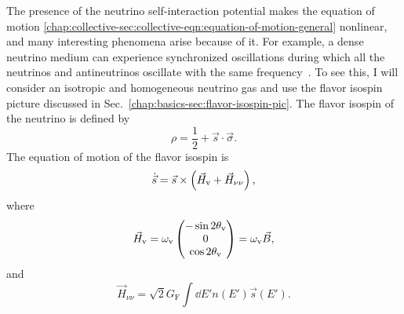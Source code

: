 The presence of the neutrino self-interaction potential makes the equation of motion \ref{chap:collective-sec:collective-eqn:equation-of-motion-general} nonlinear, and many interesting phenomena arise because of it. For example, a dense neutrino medium can experience synchronized oscillations during which all the neutrinos and antineutrinos oscillate with the same frequency~\cite{Pastor2002,Hannestad2006,Raffelt2008,Duan2010}. To see this, I will consider an isotropic and homogeneous neutrino gas and use the flavor isospin picture discussed in Sec.~\ref{chap:basics-sec:flavor-isospin-pic}. The flavor isospin of the neutrino is defined by
\begin{equation}
   \rho = \frac{1}{2} + \vec s \cdot \vec \sigma.
\end{equation}
The equation of motion of the flavor isospin is
\begin{equation}
    \dot{\vec s} = \vec s \times \left(\vec H_\vv + \vec H_{\nu\nu} \right),
    \label{chap:collective-eqn:flavor-isospin-eom}
\end{equation}
where
\begin{equation}
   \vec H_{\mathrm v} =  \omega_{\mathrm v}\begin{pmatrix}
   -\sin 2\theta_{\mathrm v}\\
   0 \\
   \cos 2\theta_{\mathrm v}
   \end{pmatrix} = \omega_\mathrm v \vec B,
\end{equation}
and
\begin{equation}
\vec H_{\nu\nu} = \sqrt{2}G_{\mathrm F} \int \dd E' n(E') \vec s(E').
\end{equation}
